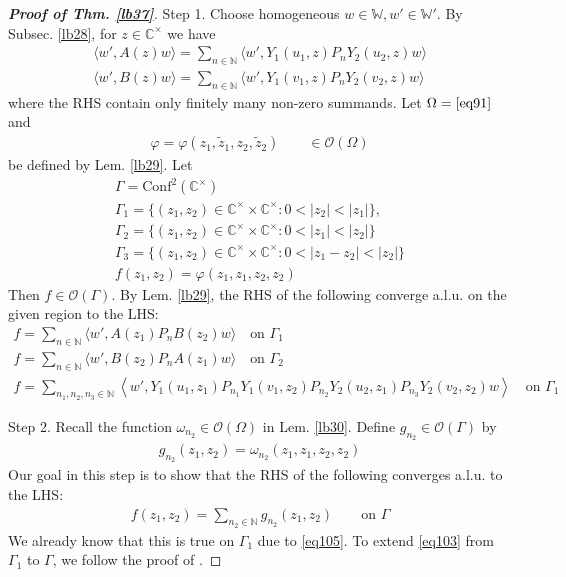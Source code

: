 \documentclass[11pt,b5paper,notitlepage]{article}
\theoremstyle{definition}
\theoremstyle{plain}
\newcommand{\mc}{\mathcal}
\newcommand{\wtd}{\widetilde}
\newcommand{\Conf}{\mathrm{Conf}}
\newcommand{\Wbb}{\mathbb W}
\newcommand{\Cbb}{\mathbb C}
\newcommand{\Nbb}{\mathbb N}
\newcommand{\<}{\left\langle}
\renewcommand{\>}{\right\rangle}
\newcommand{\bigbk}[1]{\big\langle {#1}\big\rangle}
\numberwithin{equation}{subsection}
\begin{document}
\begin{proof}[\textbf{Proof of Thm. \ref{lb37}}]
Step 1. Choose homogeneous $w\in\Wbb,w'\in\Wbb'$. By Subsec. \ref{lb28}, for $z\in\Cbb^\times$ we have
\begin{gather*}
\bigbk{w',A(z)w}=\sum_{n\in\Nbb}\bigbk{w',Y_1(u_1,z)P_nY_2(u_2,z)w}\\
\bigbk{w',B(z)w}=\sum_{n\in\Nbb}\bigbk{w',Y_1(v_1,z)P_nY_2(v_2,z)w}
\end{gather*}
where the RHS contain only finitely many non-zero summands.  Let $\Omega=\eqref{eq91}$ and
\begin{align*}
\varphi=\varphi(z_1,\wtd z_1,z_2,\wtd z_2)\qquad\in\mc O(\Omega)
\end{align*}
be defined by Lem. \ref{lb29}. Let
\begin{gather*}
\Gamma=\Conf^2(\Cbb^\times)\\
\Gamma_1=\{(z_1,z_2)\in \Cbb^\times \times \Cbb^\times :0<\vert z_2\vert <\vert z_1\vert\},\\
\Gamma_2=\{(z_1,z_2)\in \Cbb^\times \times \Cbb^\times :0<\vert z_1\vert <\vert z_2\vert\}\\
\Gamma_3=\{(z_1,z_2)\in\Cbb^\times\times\Cbb^\times:0<|z_1-z_2|<|z_2|\}\\
f(z_1,z_2)=\varphi(z_1,z_1,z_2,z_2)
\end{gather*}
Then $f\in\mc O(\Gamma)$. By Lem. \ref{lb29}, the RHS of the following converge a.l.u. on the given region to the LHS:
\begin{subequations}
\begin{gather}
f=\sum_{n\in\Nbb}\bigbk{w',A(z_1)P_n B(z_2)w}\quad \text{on }\Gamma_1 \label{eq107}\\
f=\sum_{n\in\Nbb}\bigbk{w',B(z_2)P_n A(z_1)w}\quad \text{on }\Gamma_2 \label{eq108}\\
f=\sum_{n_1,n_2,n_3\in\Nbb}\<w',Y_1(u_1,z_1)P_{n_1}Y_1(v_1,z_2)
P_{n_2}Y_2(u_2,z_1)P_{n_3}Y_2(v_2,z_2)w\>\quad\text{on }\Gamma_1  \label{eq105}
\end{gather}
\end{subequations}


Step 2. Recall the function $\omega_{n_2}\in\mc O(\Omega)$ in Lem. \ref{lb30}. Define $g_{n_2}\in\mc O(\Gamma)$ by
\begin{align*}
g_{n_2}(z_1,z_2)=\omega_{n_2}(z_1,z_1,z_2,z_2)
\end{align*} 
Our goal in this step is to show that the RHS of the following converges a.l.u. to the LHS:
\begin{align}
f(z_1,z_2)=\sum_{n_2\in\Nbb} g_{n_2}(z_1,z_2)\qquad\text{on }\Gamma \label{eq103}
\end{align}
We already know that this is true on $\Gamma_1$ due to \eqref{eq105}. To extend \eqref{eq103} from $\Gamma_1$ to $\Gamma$, we follow the proof of \cite[Thm. 8.4]{GuiLec}.




\end{proof}
\end{document}
